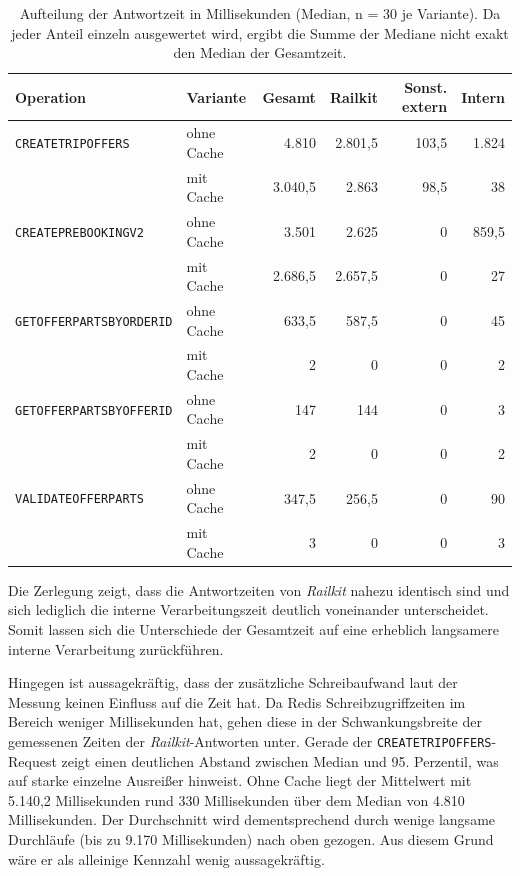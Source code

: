 \begin{table}[htbp]
    \centering
    \small
    \setlength{\tabcolsep}{4pt}
    \begin{tabular}{l l r r r r}
        \hline
        \textbf{Operation} & \textbf{Variante} & \textbf{Gesamt} & \textbf{Railkit} & \textbf{Sonst. extern} & \textbf{Intern} \\
        \hline
        \texttt{CREATETRIPOFFERS}       & ohne Cache & 4.810   & 2.801,5 & 103,5 & 1.824 \\
                                        & mit Cache  & 3.040,5 & 2.863   & 98,5  & 38 \\
        \hline
        \texttt{CREATEPREBOOKINGV2}     & ohne Cache & 3.501   & 2.625   & 0     & 859,5 \\
                                        & mit Cache  & 2.686,5 & 2.657,5 & 0     & 27 \\
        \hline
        \texttt{GETOFFERPARTSBYORDERID} & ohne Cache & 633,5   & 587,5   & 0     & 45 \\
                                        & mit Cache  & 2       & 0       & 0     & 2 \\
        \hline
        \texttt{GETOFFERPARTSBYOFFERID} & ohne Cache & 147     & 144     & 0     & 3 \\
                                        & mit Cache  & 2       & 0       & 0     & 2 \\
        \hline
        \texttt{VALIDATEOFFERPARTS}     & ohne Cache & 347,5   & 256,5   & 0     & 90 \\
                                        & mit Cache  & 3       & 0       & 0     & 3 \\
        \hline
    \end{tabular}
    \caption{Aufteilung der Antwortzeit in Millisekunden (Median, n = 30 je Variante). Da jeder Anteil einzeln ausgewertet wird, ergibt die Summe der Mediane nicht exakt den Median der Gesamtzeit.}
    \label{tab:zeitaufteilung}
\end{table}

Die Zerlegung zeigt, dass die Antwortzeiten von \textit{Railkit} nahezu identisch sind und sich lediglich die interne Verarbeitungszeit deutlich voneinander unterscheidet. Somit lassen sich die Unterschiede der Gesamtzeit auf eine erheblich langsamere interne Verarbeitung zurückführen.

Hingegen ist aussagekräftig, dass der zusätzliche Schreibaufwand laut der Messung keinen Einfluss auf die Zeit hat. Da Redis Schreibzugriffzeiten im Bereich weniger Millisekunden hat, gehen diese in der Schwankungsbreite der gemessenen Zeiten der \textit{Railkit}-Antworten unter. Gerade der \texttt{CREATETRIPOFFERS}-Request zeigt einen deutlichen Abstand zwischen Median und 95. Perzentil, was auf starke einzelne Ausreißer hinweist. Ohne Cache liegt der Mittelwert mit 5.140,2 Millisekunden rund 330 Millisekunden über dem Median von 4.810 Millisekunden. Der Durchschnitt wird dementsprechend durch wenige langsame Durchläufe (bis zu 9.170 Millisekunden) nach oben gezogen. Aus diesem Grund wäre er als alleinige Kennzahl wenig aussagekräftig.

